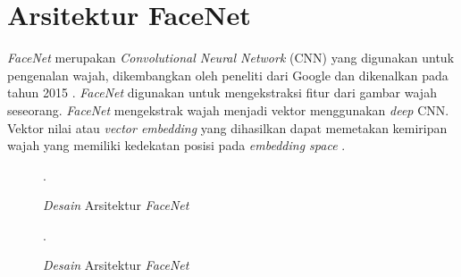 
\section{Arsitektur FaceNet}
\par \textit{FaceNet} merupakan \textit{Convolutional Neural Network} (CNN) yang digunakan untuk pengenalan wajah, dikembangkan oleh peneliti dari Google dan dikenalkan pada tahun 2015 \citep{jose2019}. \textit{FaceNet} digunakan untuk mengekstraksi fitur dari gambar wajah seseorang. \textit{FaceNet} mengekstrak wajah menjadi vektor menggunakan \textit{deep} CNN. Vektor nilai atau \textit{vector embedding} yang dihasilkan dapat memetakan kemiripan wajah yang memiliki kedekatan posisi pada \textit{embedding space} \citep{rajagede2021}.

\begin{figure}[H]
\centering
{}
\caption{\textit{Desain} Arsitektur \textit{FaceNet}}.
\label{dig_facenet}
\end{figure}

\begin{figure}[H]
\centering
{}
\caption{\textit{Desain} Arsitektur \textit{FaceNet}}.
\label{dig_facenet}
\end{figure}

\fancyhf{} 
\fancyfoot[R]{\thepage}

